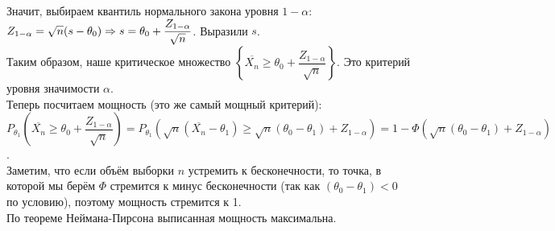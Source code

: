 \begin{example}
    Значит, выбираем квантиль нормального закона уровня $1 - \alpha$:
    $Z_{1 - \alpha} = \sqrt{n}(s - \theta_0) \Rightarrow \\ s = \theta_0 + \dfrac{Z_{1 - \alpha}}{\sqrt{n}}$. Выразили
    $s$.  \\
    
    Таким образом, наше критическое множество $\left \{ \overline{X_n} \geqslant \theta_0 + \dfrac{Z_{1 - \alpha}}{\sqrt{n}}\right \}$. Это
    критерий уровня значимости $\alpha$. \\

    Теперь посчитаем мощность (это же самый мощный критерий): \\
    $P_{\theta_1}\left (\overline{X_n} \geqslant \theta_0 + \dfrac{Z_{1 - \alpha}}{\sqrt{n}} \right) = 
    P_{\theta_1}\left (\sqrt{n}(\overline{X_n} - \theta_1) \geqslant \sqrt{n}(\theta_0
    - \theta_1) + Z_{1 - \alpha} \right) = 1 - \Phi(\sqrt{n}(\theta_0
    - \theta_1) + Z_{1 - \alpha})$. \\
    
    Заметим, что если объём выборки $n$ устремить к бесконечности, то точка, в которой мы берём
    $\Phi$ стремится к минус бесконечности (так как $(\theta_0
    - \theta_1) < 0$ по условию), поэтому мощность стремится к 1.\\
    
    По теореме Неймана-Пирсона выписанная мощность максимальна.

\end{example}